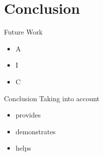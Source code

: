 \documentclass[handout]{beamer}
\begin{document}
\section{Conclusion}

\begin{frame}{Future Work}
\pause
\begin{itemize}[<+->]
	\item A
	\item I
	\item C
\end{itemize}

\end{frame}


\begin{frame}{Conclusion}
Taking into account
\pause
\begin{itemize}[<+->]
		\item provides 
		\item demonstrates 
		\item helps 
\end{itemize}

\end{frame}
\end{document}
